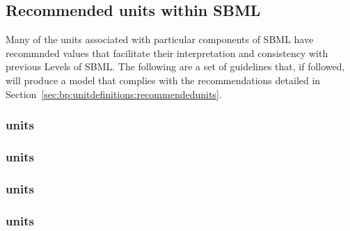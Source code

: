 \subsection{Recommended units within SBML}

Many of the units associated with particular components of SBML 
have recommnded values that facilitate their interpretation and 
consistency with previous Levels of SBML. The following are a set 
of guidelines that, if followed, will produce a model that complies
with the recommendations detailed in 
Section~\ref{sec:bp:unitdefinitions:recommendedunits}.

\subsubsection*{ units} \begin{sbmlenum}


\end{sbmlenum} 

\subsubsection*{ units} \begin{sbmlenum}


\end{sbmlenum} 

\subsubsection*{ units} \begin{sbmlenum}


\end{sbmlenum} 

\subsubsection*{ units} \begin{sbmlenum}


\end{sbmlenum} 

